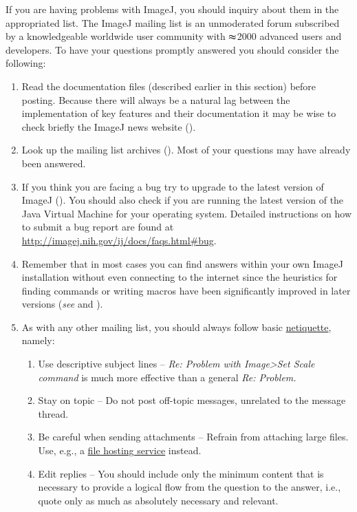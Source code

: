 If you are having problems with ImageJ, you should inquiry about them
in the appropriated list. The ImageJ mailing
list is an unmoderated forum subscribed by a knowledgeable worldwide
user community with $\thickapprox$2000 advanced users and developers.
To have your questions promptly answered you should consider the following:
\begin{enumerate}
\item Read the documentation files (described earlier in this section) before
posting. Because there will always be a natural lag between the implementation
of key features and their documentation it may be wise to check briefly
the ImageJ news website (\textsf{}).
\item Look up the mailing list archives (\textsf{}).
Most of your questions may have already been answered.
\item If you think you are facing a bug
try to upgrade to the latest version of ImageJ (\textsf{}).
You should also check if you are running the latest version of the
Java Virtual Machine for your operating system. Detailed instructions
on how to submit a bug report are found at \url{http://imagej.nih.gov/ij/docs/faqs.html#bug}.
\item Remember that in most cases you can find answers within your own ImageJ
installation without even connecting to the internet since the heuristics
for finding commands or writing macros have been significantly improved
in later versions (\emph{see}  and
).
\item As with any other mailing list, you should always follow basic \href{http://en.wikipedia.org/wiki/Netiquette}{netiquette},
namely:

\begin{enumerate}
\item Use descriptive subject lines -- \emph{Re: Problem with Image>Set
Scale command }is much more effective than a general\emph{ Re: Problem.}
\item Stay on topic -- Do not post off-topic messages, unrelated to the
message thread.
\item Be careful when sending attachments -- Refrain from attaching large
files. Use, e.g., a \href{http://en.wikipedia.org/wiki/File_hosting_service\#Comparison_of_notable_file_hosting_services}{file hosting service}
instead.
\item Edit replies -- You should include only the minimum content that is
necessary to provide a logical flow from the question to the answer,
i.e., quote only as much as absolutely necessary and relevant.\end{enumerate}
\end{enumerate}

